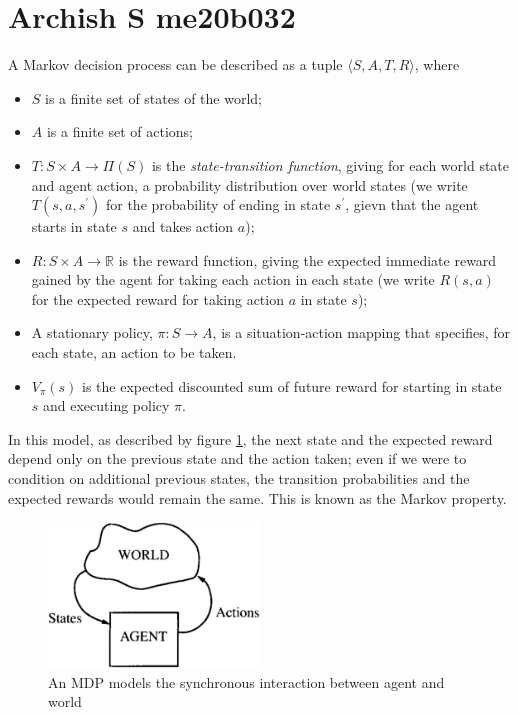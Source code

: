 \section{Archish S me20b032}
A Markov decision process \cite{POMDP} can be described as a tuple $ \langle S, A, T, R \rangle $, where
\begin{itemize}
	\item $S$ is a finite set of states of the world;
	\item $A$ is a finite set of actions;
	\item $T : S \times A \rightarrow \Pi(S)$ is the \textit{state-transition function}, giving for each world state and agent action, a probability distribution over world states (we write $T(s,a,s^\prime)$ for the probability of ending in state $s^\prime$, gievn that the agent starts in state $s$ and takes action $a$);
	\item $R : S \times A \rightarrow \mathbb{R}$ is the reward function, giving the expected immediate reward gained by the agent for taking each action in each state (we write $R(s,a)$ for the expected reward for taking action $a$ in state $s$);
	\item A stationary policy, $ \pi : S \rightarrow A $, is a situation-action mapping that specifies, for each state, an action to be taken.
	\item $V_{\pi}(s)$ is the expected discounted sum of future reward for starting in state $s$ and executing policy $\pi$.
\end{itemize}

In this model, as described by figure \ref{fig:MDP}, the next state and the expected reward depend only on the previous state and the action taken; even if we were to condition on additional previous states, the transition probabilities and the expected rewards would remain the same. This is known as the Markov property.

\begin{figure}[!ht]
	\begin{center}
		\includegraphics[width=0.5\textwidth]{me20b032/me20b032.eps}
  		\caption{An MDP models the synchronous interaction between agent and world}
		\label{fig:MDP}
	\end{center}
\end{figure}


